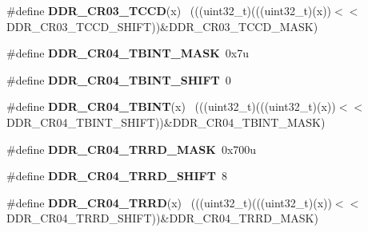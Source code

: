 \begin{DoxyCompactItemize}
\item 
\hypertarget{group___d_d_r___register___masks_ga395acf65aac593426d1e7edf176c896a}{}\#define {\bfseries D\+D\+R\+\_\+\+C\+R03\+\_\+\+T\+C\+C\+D}(x)                                              ~(((uint32\+\_\+t)(((uint32\+\_\+t)(x))$<$$<$D\+D\+R\+\_\+\+C\+R03\+\_\+\+T\+C\+C\+D\+\_\+\+S\+H\+I\+F\+T))\&D\+D\+R\+\_\+\+C\+R03\+\_\+\+T\+C\+C\+D\+\_\+\+M\+A\+S\+K)\label{group___d_d_r___register___masks_ga395acf65aac593426d1e7edf176c896a}

\item 
\hypertarget{group___d_d_r___register___masks_ga02302bab2e6a9c962e14b67e7035f5fe}{}\#define {\bfseries D\+D\+R\+\_\+\+C\+R04\+\_\+\+T\+B\+I\+N\+T\+\_\+\+M\+A\+S\+K}~0x7u\label{group___d_d_r___register___masks_ga02302bab2e6a9c962e14b67e7035f5fe}

\item 
\hypertarget{group___d_d_r___register___masks_gae81e3451e4191a4b5a15a72cc95023e0}{}\#define {\bfseries D\+D\+R\+\_\+\+C\+R04\+\_\+\+T\+B\+I\+N\+T\+\_\+\+S\+H\+I\+F\+T}~0\label{group___d_d_r___register___masks_gae81e3451e4191a4b5a15a72cc95023e0}

\item 
\hypertarget{group___d_d_r___register___masks_ga4af24e84b675287cfb107eab610e917a}{}\#define {\bfseries D\+D\+R\+\_\+\+C\+R04\+\_\+\+T\+B\+I\+N\+T}(x)                                            ~(((uint32\+\_\+t)(((uint32\+\_\+t)(x))$<$$<$D\+D\+R\+\_\+\+C\+R04\+\_\+\+T\+B\+I\+N\+T\+\_\+\+S\+H\+I\+F\+T))\&D\+D\+R\+\_\+\+C\+R04\+\_\+\+T\+B\+I\+N\+T\+\_\+\+M\+A\+S\+K)\label{group___d_d_r___register___masks_ga4af24e84b675287cfb107eab610e917a}

\item 
\hypertarget{group___d_d_r___register___masks_gac34bd9dd5331b1e3b8b62719a9802c81}{}\#define {\bfseries D\+D\+R\+\_\+\+C\+R04\+\_\+\+T\+R\+R\+D\+\_\+\+M\+A\+S\+K}~0x700u\label{group___d_d_r___register___masks_gac34bd9dd5331b1e3b8b62719a9802c81}

\item 
\hypertarget{group___d_d_r___register___masks_ga3a450ddbfce072f3771dc30eb5c2a835}{}\#define {\bfseries D\+D\+R\+\_\+\+C\+R04\+\_\+\+T\+R\+R\+D\+\_\+\+S\+H\+I\+F\+T}~8\label{group___d_d_r___register___masks_ga3a450ddbfce072f3771dc30eb5c2a835}

\item 
\hypertarget{group___d_d_r___register___masks_gaba4a124fefd8d572651c8df833867eae}{}\#define {\bfseries D\+D\+R\+\_\+\+C\+R04\+\_\+\+T\+R\+R\+D}(x)                                              ~(((uint32\+\_\+t)(((uint32\+\_\+t)(x))$<$$<$D\+D\+R\+\_\+\+C\+R04\+\_\+\+T\+R\+R\+D\+\_\+\+S\+H\+I\+F\+T))\&D\+D\+R\+\_\+\+C\+R04\+\_\+\+T\+R\+R\+D\+\_\+\+M\+A\+S\+K)\label{group___d_d_r___register___masks_gaba4a124fefd8d572651c8df833867eae}


\end{DoxyCompactItemize}
